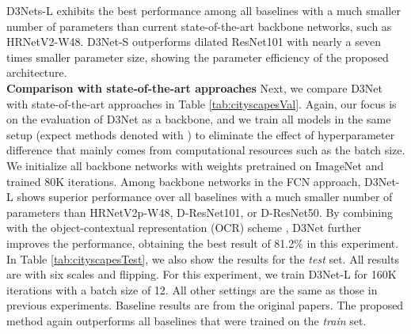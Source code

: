 \documentclass[final]{cvpr}
\begin{document}
D3Nets-L exhibits the best performance among all baselines with a much smaller number of parameters than current state-of-the-art backbone networks, such as HRNetV2-W48. D3Net-S outperforms dilated ResNet101 with nearly a seven times smaller parameter size, showing the parameter efficiency of the proposed architecture.
\vspace{3mm}\\
\textbf{Comparison with state-of-the-art approaches} \hspace{1mm}
Next, we compare D3Net with state-of-the-art approaches in Table \ref{tab:cityscapesVal}. Again, our focus is on the evaluation of D3Net as a backbone, and we train all models in the same setup (expect methods denoted with ) to eliminate the effect of hyperparameter difference that mainly comes from computational resources such as the batch size.  We initialize all backbone networks with weights pretrained on ImageNet \cite{ILSVRC15} and trained 80K iterations.
Among backbone networks in the FCN approach, D3Net-L shows superior performance over all baselines with a much smaller number of parameters than HRNetV2p-W48\cite{WangSCJDZLMTWLX19}, D-ResNet101, or D-ResNet50. By combining with the object-contextual representation (OCR)
scheme \cite{Yuan20OCR}, D3Net further improves the performance, obtaining the best result of 81.2\% in this experiment.
In Table \ref{tab:cityscapesTest}, we also show the results for the \textit{test} set. All results are with six scales and flipping. For this experiment, we train D3Net-L for 160K iterations with a batch size of 12. All other settings are the same as those in previous experiments. 
Baseline results are from the original papers. The proposed method again outperforms all baselines that were trained on the \textit{train} set. 
\end{document}
